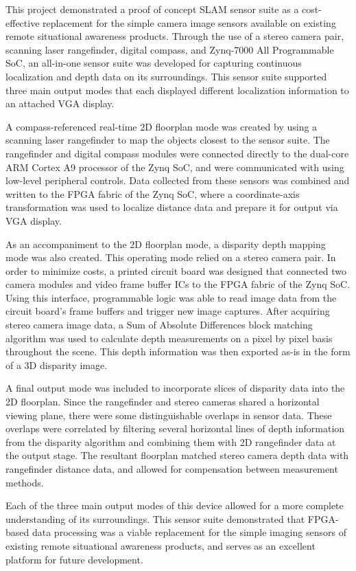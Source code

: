 This project demonstrated a proof of concept SLAM sensor suite as a cost-effective replacement for the simple camera image sensors available on existing remote situational awareness products. Through the use of a stereo camera pair, scanning laser rangefinder,  digital compass, and Zynq-7000 All Programmable SoC, an all-in-one sensor suite was developed for capturing continuous localization and depth data on its surroundings. This sensor suite supported three main output modes that each displayed different localization information to an attached VGA display.
\par
A compass-referenced real-time 2D floorplan mode was created by using a scanning laser rangefinder to map the objects closest to the sensor suite. The rangefinder and digital compass modules were connected directly to the dual-core ARM Cortex A9 processor of the Zynq SoC, and were communicated with using low-level peripheral controls. Data collected from these sensors was combined and written to the FPGA fabric of the Zynq SoC, where a coordinate-axis transformation was used to localize distance data and prepare it for output via VGA display.
\par
As an accompaniment to the 2D floorplan mode, a disparity depth mapping mode was also created. This operating mode relied on a stereo camera pair. In order to minimize costs, a printed circuit board was designed that connected two camera modules and video frame buffer ICs to the FPGA fabric of the Zynq SoC. Using this interface, programmable logic was able to read image data from the circuit board’s frame buffers and trigger new image captures. After acquiring stereo camera image data, a Sum of Absolute Differences block matching algorithm was used to calculate depth measurements on a pixel by pixel basis throughout the scene. This depth information was then exported as-is in the form of a 3D disparity image.
\par
A final output mode was included to incorporate slices of disparity data into the 2D floorplan. Since the rangefinder and stereo cameras shared a horizontal viewing plane, there were some distinguishable overlaps in sensor data. These overlaps were correlated by filtering several horizontal lines of depth information from the disparity algorithm and combining them with 2D rangefinder data at the output stage. The resultant floorplan matched stereo camera depth data with rangefinder distance data, and allowed for compensation between measurement methods.
\par
Each of the three main output modes of this device allowed for a more complete understanding of its surroundings. This sensor suite demonstrated that FPGA-based data processing was a viable replacement for the simple imaging sensors of existing remote situational awareness products, and serves as an excellent platform for future development.

